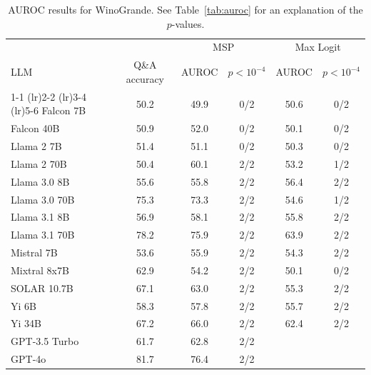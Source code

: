 \begin{table}[h]
\caption{AUROC results for WinoGrande. See Table~\ref{tab:auroc} for an explanation of the $p$-values.}
\label{tab:winogrande_auroc}
\centering
\begin{tabular}{lccccc}
\toprule
& & \multicolumn{2}{c}{MSP} & \multicolumn{2}{c}{Max Logit} \\ 
LLM & Q\&A accuracy & AUROC & $p < 10^{-4}$ & AUROC & $p < 10^{-4}$ \\ 
\cmidrule(lr){1-1} \cmidrule(lr){2-2} \cmidrule(lr){3-4} \cmidrule(lr){5-6} 
Falcon 7B & 50.2 & 49.9 & 0/2 & 50.6 & 0/2\\
Falcon 40B & 50.9 & 52.0 & 0/2 & 50.1 & 0/2\\
Llama 2 7B & 51.4 & 51.1 & 0/2 & 50.3 & 0/2\\
Llama 2 70B & 50.4 & 60.1 & 2/2 & 53.2 & 1/2\\
Llama 3.0 8B & 55.6 & 55.8 & 2/2 & 56.4 & 2/2\\
Llama 3.0 70B & 75.3 & 73.3 & 2/2 & 54.6 & 1/2\\
Llama 3.1 8B & 56.9 & 58.1 & 2/2 & 55.8 & 2/2\\
Llama 3.1 70B & 78.2 & 75.9 & 2/2 & 63.9 & 2/2\\
Mistral 7B & 53.6 & 55.9 & 2/2 & 54.3 & 2/2\\
Mixtral 8x7B & 62.9 & 54.2 & 2/2 & 50.1 & 0/2\\
SOLAR 10.7B & 67.1 & 63.0 & 2/2 & 55.3 & 2/2\\
Yi 6B & 58.3 & 57.8 & 2/2 & 55.7 & 2/2\\
Yi 34B & 67.2 & 66.0 & 2/2 & 62.4 & 2/2\\
GPT-3.5 Turbo & 61.7 & 62.8 & 2/2 &  & \\
GPT-4o & 81.7 & 76.4 & 2/2 &  & \\
\bottomrule
\end{tabular}
\end{table}
